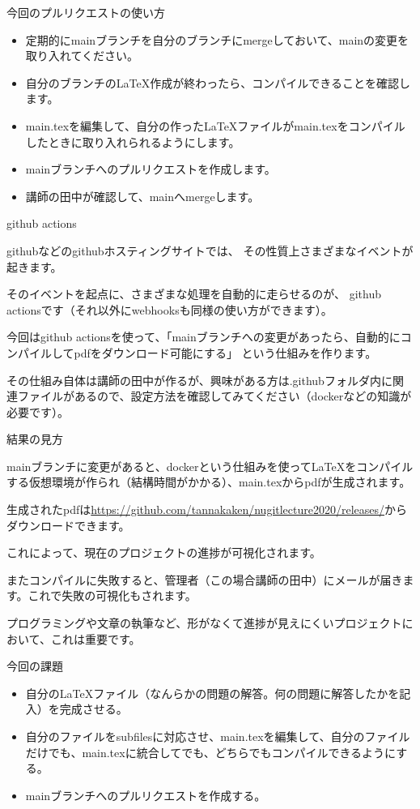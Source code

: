 \documentclass[12pt, unicode]{beamer}
\begin{document}
\begin{frame}{今回のプルリクエストの使い方}

\begin{itemize}
\item 定期的にmainブランチを自分のブランチにmergeしておいて、mainの変更を取り入れてください。
\item 自分のブランチのLaTeX作成が終わったら、コンパイルできることを確認します。
\item main.texを編集して、自分の作ったLaTeXファイルがmain.texをコンパイルしたときに取り入れられるようにします。
\item mainブランチへのプルリクエストを作成します。
\item 講師の田中が確認して、mainへmergeします。
\end{itemize}

\end{frame}
\begin{frame}{github actions}

githubなどのgithubホスティングサイトでは、
その性質上さまざまなイベントが起きます。

そのイベントを起点に、さまざまな処理を自動的に走らせるのが、
github actionsです（それ以外にwebhooksも同様の使い方ができます）。

今回はgithub actionsを使って、「mainブランチへの変更があったら、自動的にコンパイルしてpdfをダウンロード可能にする」
という仕組みを作ります。


その仕組み自体は講師の田中が作るが、興味がある方は.githubフォルダ内に関連ファイルがあるので、設定方法を確認してみてください（dockerなどの知識が必要です）。

\end{frame}
\begin{frame}{結果の見方}

mainブランチに変更があると、dockerという仕組みを使って\LaTeX をコンパイルする仮想環境が作られ（結構時間がかかる）、main.texからpdfが生成されます。

生成されたpdfは\url{https://github.com/tannakaken/nugitlecture2020/releases/}からダウンロードできます。

これによって、現在のプロジェクトの進捗が可視化されます。

またコンパイルに失敗すると、管理者（この場合講師の田中）にメールが届きます。これで失敗の可視化もされます。

プログラミングや文章の執筆など、形がなくて進捗が見えにくいプロジェクトにおいて、これは重要です。
\end{frame}

\begin{frame}{今回の課題}

\begin{itemize}
\item 自分の\LaTeX ファイル（なんらかの問題の解答。何の問題に解答したかを記入）を完成させる。
\item 自分のファイルをsubfilesに対応させ、main.texを編集して、自分のファイルだけでも、main.texに統合してでも、どちらでもコンパイルできるようにする。
\item mainブランチへのプルリクエストを作成する。
\end{itemize}
\end{frame}
\end{document}
